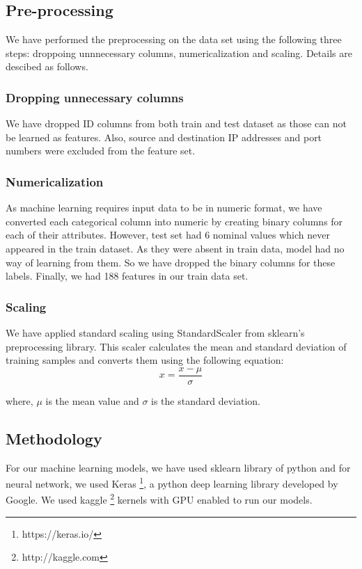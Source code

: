 \documentclass[14pt, conference]{IEEEtran}
\begin{document}
\subsection{Pre-processing}
We have performed the preprocessing on the data set using the following three steps: droppoing unnnecessary columns, numericalization and scaling. Details are descibed as follows.

\subsubsection{Dropping unnecessary columns}
We have dropped ID columns from both train and test dataset as those can not be learned as features. Also, source and destination IP addresses and port numbers were excluded from the feature set.

\subsubsection{Numericalization}
As machine learning requires input data to be in numeric format, we have converted each categorical column into numeric by creating binary columns for each of their attributes. However, test set had 6 nominal values which never appeared in the train dataset. As they were absent in train data, model had no way of learning from them. So we have dropped the binary columns for these labels. Finally, we had 188 features in our train data set.

\subsubsection{Scaling}
We have applied standard scaling using StandardScaler from sklearn's preprocessing library. This scaler calculates the mean and standard deviation of training  samples and converts them using the following equation: 
\begin{equation}
    x = \frac{x-\mu}{\sigma}
\end{equation}

where, $\mu$ is the mean value and $\sigma$ is the standard deviation. 

\subsection{Methodology}
For our machine learning models, we have used sklearn library of python and  for neural network, we used Keras  \footnote{https://keras.io/}, a python deep learning library developed by Google. We used kaggle \footnote{http://kaggle.com} kernels with GPU enabled to run our models. 
\end{document}
